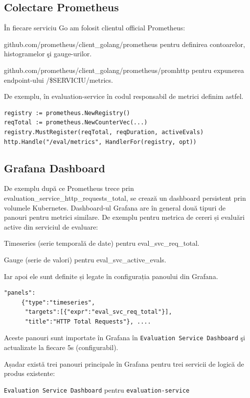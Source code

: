 \subsection{Colectare Prometheus}  
În fiecare serviciu Go am folosit clientul official Prometheus:

github.com/prometheus/client\_golang/prometheus pentru definirea contoarelor, 
histogramelor şi gauge-urilor.

github.com/prometheus/client\_golang/prometheus/promhttp pentru expunerea 
endpoint-ului /\$SERVICIU/metrics.

De exemplu, în evaluation-service în codul responsabil de metrici definim astfel. 
\begin{lstlisting}[style=yamlstyle]
registry := prometheus.NewRegistry()
reqTotal := prometheus.NewCounterVec(...)
registry.MustRegister(reqTotal, reqDuration, activeEvals)
http.Handle("/eval/metrics", HandlerFor(registry, opt))
\end{lstlisting}

\subsection{Grafana Dashboard}  
De exemplu după ce Prometheus trece prin evaluation\_service\_http\_requests\_total, se crează un dashboard 
persistent prin volumele Kubernetes. Dashboard-ul Grafana are în general două tipuri de panouri pentru metrici 
similare. De exemplu pentru metrica de cereri și evaluări active din serviciul de evaluare:

Timeseries (serie temporală de date) pentru eval\_svc\_req\_total.

Gauge (serie de valori) pentru eval\_svc\_active\_evals.

Iar apoi ele sunt definite și legate în configurația panoului din Grafana.
\begin{lstlisting}[style=yamlstyle]
  "panels":
     {"type":"timeseries",
      "targets":[{"expr":"eval_svc_req_total"}],
      "title":"HTTP Total Requests"}, ....
\end{lstlisting}
Aceste panouri sunt importate în Grafana în \texttt{Evaluation Service Dashboard} şi actualizate
la fiecare 5s (configurabil).

Așadar există trei panouri principale în Grafana pentru trei servicii de logică de produs existente:
  
  \texttt{Evaluation Service Dashboard} pentru \texttt{evaluation-service}
  
